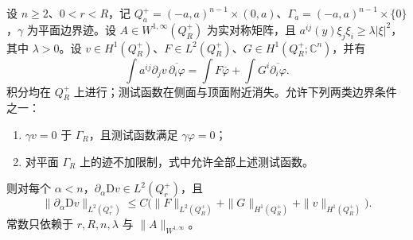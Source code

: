 \begin{lemma}\label{g3:lem:boundary-tangential-differences}
	设 \(n\ge2\)、\(0<r<R\)，记 \(Q_a^+=(-a,a)^{n-1}\times(0,a)\)、\(\Gamma_a=(-a,a)^{n-1}\times\{0\}\)，\(\gamma\) 为平面边界迹。设 \(A\in W^{1,\infty}(Q_R^+)\) 为实对称矩阵，且
	\(a^{ij}(y)\xi_j\xi_i\ge\lambda|\xi|^2\)，其中 \(\lambda>0\)。设 \(v\in H^1(Q_R^+)\)、\(F\in L^2(Q_R^+)\)、\(G\in H^1(Q_R^+;\mathbb C^n)\)，并有
	\begin{equation}\label{g3:eq:flat-boundary-weak-div-source}
	\int a^{ij}\partial_jv\,\overline{\partial_i\varphi}
	=\int F\overline\varphi+\int G^i\overline{\partial_i\varphi}.
	\end{equation}
	积分均在 \(Q_R^+\) 上进行；测试函数在侧面与顶面附近消失。允许下列两类边界条件之一：
	\begin{enumerate}
		\item \(\gamma v=0\) 于 \(\Gamma_R\)，且测试函数满足 \(\gamma\varphi=0\)；
		\item 对平面 \(\Gamma_R\) 上的迹不加限制，式中允许全部上述测试函数。
	\end{enumerate}
	则对每个 \(\alpha<n\)，\(\partial_\alpha\mathrm Dv\in L^2(Q_r^+)\)，且
	\[
	\|\partial_\alpha\mathrm Dv\|_{L^2(Q_r^+)}
	\le C\bigl(\|F\|_{L^2(Q_R^+)}
							+\|G\|_{H^1(Q_R^+)}+\|v\|_{H^1(Q_R^+)}\bigr).
	\]
	常数只依赖于 \(r,R,n,\lambda\) 与 \(\|A\|_{W^{1,\infty}}\)。
\end{lemma}
